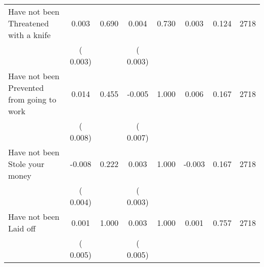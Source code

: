 \begin{tabular}{l*{7}{c}}
 Have not been Threatened with a knife       &              0.003       &        0.690  &              0.004       &        0.730  &              0.003       &              0.124 &  2718 \\ 
                       &       (       0.003)             &                               &       (       0.003)                     &                               &                                               &                                &                      \\ 

 Have not been Prevented from going to work       &              0.014       &        0.455  &             -0.005       &        1.000  &              0.006       &              0.167 &  2718 \\ 
                       &       (       0.008)             &                               &       (       0.007)                     &                               &                                               &                                &                      \\ 

 Have not been Stole your money       &             -0.008       &        0.222  &              0.003       &        1.000  &             -0.003       &              0.167 &  2718 \\ 
                       &       (       0.004)             &                               &       (       0.003)                     &                               &                                               &                                &                      \\ 

 Have not been Laid off       &              0.001       &        1.000  &              0.003       &        1.000  &              0.001       &              0.757 &  2718 \\ 
                       &       (       0.005)             &                               &       (       0.005)                     &                               &                                               &                                &                      \\ 

\hline \end{tabular}